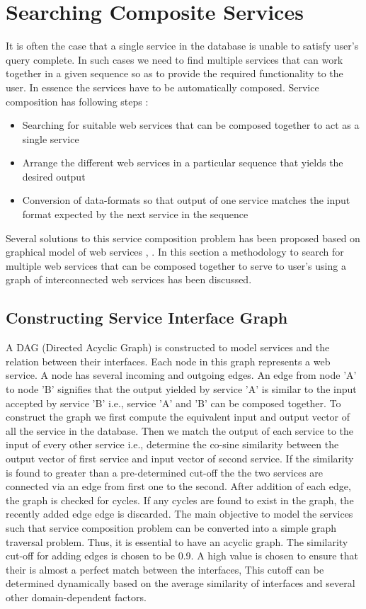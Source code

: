 \documentclass[12pt, oneside]{book}
\begin{document}
\section{Searching Composite Services}
It is often the case that a single service in the database is unable to satisfy user's query complete. In such cases we need to find multiple services that can work together in a given sequence so as to provide the required functionality to the user. In essence the services have to be automatically composed. Service composition has following steps :
\begin{itemize}
 \item Searching for suitable web services that can be composed together to act as a single service
 \item Arrange the different web services in a particular sequence that yields the desired output
 \item Conversion of data-formats so that output of one service matches the input format expected by the next service in the sequence
\end{itemize}
Several solutions to this service composition problem has been proposed based on graphical model of web services \cite{graph_search}, \cite{graph_composition}. In this section a methodology to search for multiple web services that can be composed together to serve to user's using a graph of interconnected web services has been discussed.

\subsection{Constructing Service Interface Graph}
A DAG (Directed Acyclic Graph) is constructed to model services and the relation between their interfaces. Each node in this graph represents a web service. A node has several incoming and outgoing edges. An edge from node 'A' to node 'B' signifies that the output yielded by service 'A' is similar to the input accepted by service 'B' i.e., service 'A' and 'B' can be composed together. To construct the graph we first compute the equivalent input and output vector of all the service in the database. Then we match the output of each service to the input of every other service i.e., determine the co-sine similarity between the output vector of first service and input vector of second service. If the similarity is found to greater than a pre-determined cut-off the the two services are connected via an edge from first one to the second. After addition of each edge, the graph is checked for cycles. If any cycles are found to exist in the graph, the recently added edge edge is discarded. The main objective to model the services such that service composition problem can be converted into a simple graph traversal problem. Thus, it is essential to have an acyclic graph. The similarity cut-off for adding edges is chosen to be 0.9. A high value is chosen to ensure that their is almost a perfect match between the interfaces, This cutoff can be determined dynamically based on the average similarity of interfaces and several other domain-dependent factors.
\end{document}
